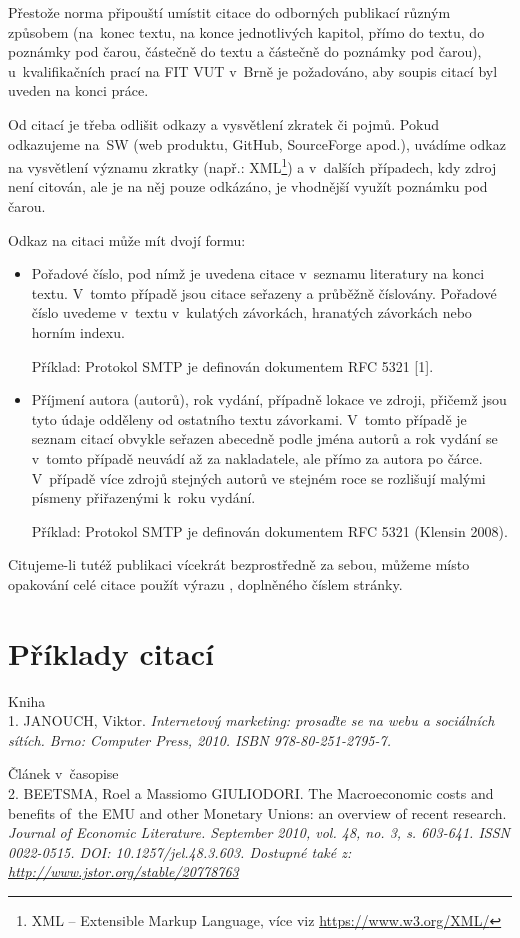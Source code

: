 Přestože norma připouští umístit citace do odborných publikací různým způsobem (na~konec textu, na konce jednotlivých kapitol, přímo do textu, do poznámky pod čarou, částečně do textu a částečně do poznámky pod čarou), u~kvalifikačních prací na FIT VUT v~Brně je požadováno, aby soupis citací byl uveden na konci práce.

Od citací je třeba odlišit odkazy a vysvětlení zkratek či pojmů. Pokud odkazujeme na~SW (web produktu, GitHub, SourceForge apod.), uvádíme odkaz na vysvětlení významu zkratky (např.: XML\footnote{XML -- Extensible Markup Language, více viz \url{https://www.w3.org/XML/}}) a v~dalších případech, kdy zdroj není citován, ale je na něj pouze odkázáno, je vhodnější využít poznámku pod čarou.

Odkaz na citaci může mít dvojí formu:
\begin{itemize}
  \item{Pořadové číslo, pod nímž je uvedena citace v~seznamu literatury na konci textu. V~tomto případě jsou citace seřazeny a průběžně číslovány. Pořadové číslo uvedeme v~textu v~kulatých závorkách, hranatých závorkách nebo horním indexu.

  Příklad: Protokol SMTP je definován dokumentem RFC 5321 [1].}
  \item{Příjmení autora (autorů), rok vydání, případně lokace ve zdroji, přičemž jsou tyto údaje odděleny od ostatního textu závorkami. V~tomto případě je seznam citací obvykle seřazen abecedně podle jména autorů a rok vydání se v~tomto případě neuvádí až za nakladatele, ale přímo za autora po čárce. V~případě více zdrojů stejných autorů ve stejném roce se rozlišují malými písmeny přiřazenými k~roku vydání.

  Příklad: Protokol SMTP je definován dokumentem RFC 5321 (Klensin 2008).}
\end{itemize}

Citujeme-li tutéž publikaci vícekrát bezprostředně za sebou, můžeme místo opakování celé citace použít výrazu , doplněného číslem stránky.

\section{Příklady citací}

Kniha \\
1. JANOUCH, Viktor. \it Internetový marketing: prosaďte se na webu a sociálních sítích\rm . Brno: Computer Press, 2010. ISBN 978-80-251-2795-7.

\bigskip
\noindent Článek v~časopise \\
2. BEETSMA, Roel a Massiomo GIULIODORI. The Macroeconomic costs and benefits of~the EMU and other Monetary Unions: an overview of recent research. \it Journal of Economic Literature\rm . September 2010, vol. 48, no. 3, s. 603-641. ISSN 0022-0515. \linebreak[4] DOI: 10.1257/jel.48.3.603. Dostupné také z: \url{http://www.jstor.org/stable/20778763}

